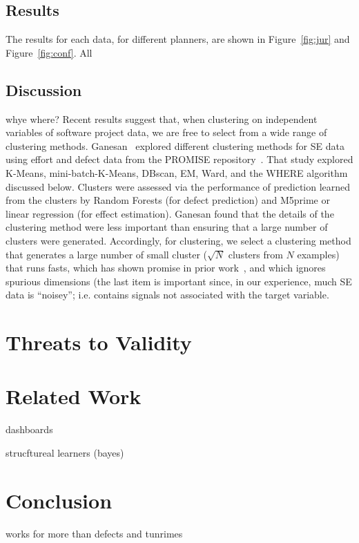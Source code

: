 \documentclass{sig-alternate}
\newcommand{\fig}[1]{Figure~\ref{fig:#1}}
\begin{document}
\subsection{Results}

The results for each data, for different planners, are shown in \fig{jur} and \fig{conf}. All
\subsection{Discussion}	whye where?
Recent results suggest that, when clustering on independent variables of software project data,
	we are free to select from a wide range of 
	clustering methods.  Ganesan~\cite{div14} explored 
	different clustering methods for SE data using   effort and defect data from
	the PROMISE repository~\cite{promiserepo}.
	That study explored
	K-Means, mini-batch-K-Means, DBscan, EM, Ward, and the WHERE algorithm discussed
	below.
	Clusters were assessed via the performance of prediction 
	learned from the clusters by Random Forests (for defect prediction)
	and M5prime or linear regression (for effect estimation).  Ganesan found
	that the details of the clustering method were less important than ensuring that  a large number of clusters were generated.
	Accordingly, for clustering, we select a clustering method that generates a large
	number of small cluster
	($\sqrt{N}$ clusters
	from $N$ examples) that runs fasts, which has shown promise in prior work~\cite{Menzies2013}, and which ignores spurious dimensions (the last item is important since, in our experience, much SE data is ``noisey''; i.e. contains signals not associated with the target variable.
	
\section{Threats to Validity}
\section{Related Work}
dashboards

strucftureal learners (bayes)

\section{Conclusion}

works for more than defects and tunrimes
\end{document}

